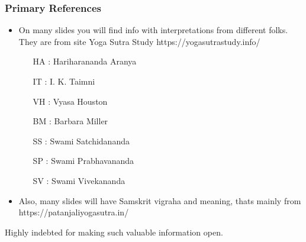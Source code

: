 \begin{frame}[fragile]\frametitle{Primary References}
	\begin{itemize}
	\item On many slides you will find info with interpretations from different folks. They are from  site Yoga Sutra Study https://yogasutrastudy.info/
		\begin{itemize}
		\item [HA]: Hariharananda Aranya
		\item [IT]: I. K. Taimni
		\item [VH]: Vyasa Houston
		\item [BM]: Barbara Miller
		\item [SS]: Swami Satchidananda
		\item [SP]: Swami Prabhavananda
		\item [SV]: Swami Vivekananda
		\end{itemize}	
	\item Also, many slides will have Samskrit vigraha and meaning, thats mainly from https://patanjaliyogasutra.in/
	\end{itemize}

Highly indebted for making such valuable information open.

\end{frame}